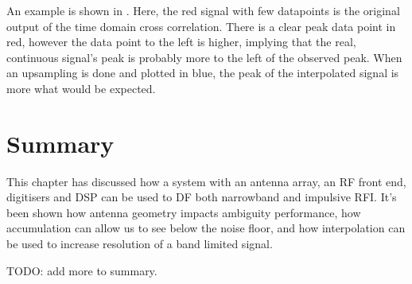 An example is shown in . Here, the red signal with few datapoints is the original output of the time domain cross correlation. There is a clear peak data point in red, however the data point to the left is higher, implying that the real, continuous signal's peak is probably more to the left of the observed peak. When an upsampling is done and plotted in blue, the peak of the interpolated signal is more what would be expected.

\section{Summary}
This chapter has discussed how a system with an antenna array, an RF front end, digitisers and DSP can be used to DF both narrowband and impulsive RFI. It's been shown how antenna geometry impacts ambiguity performance, how accumulation can allow us to see below the noise floor, and how interpolation can be used to increase resolution of a band limited signal.

TODO: add more to summary.
